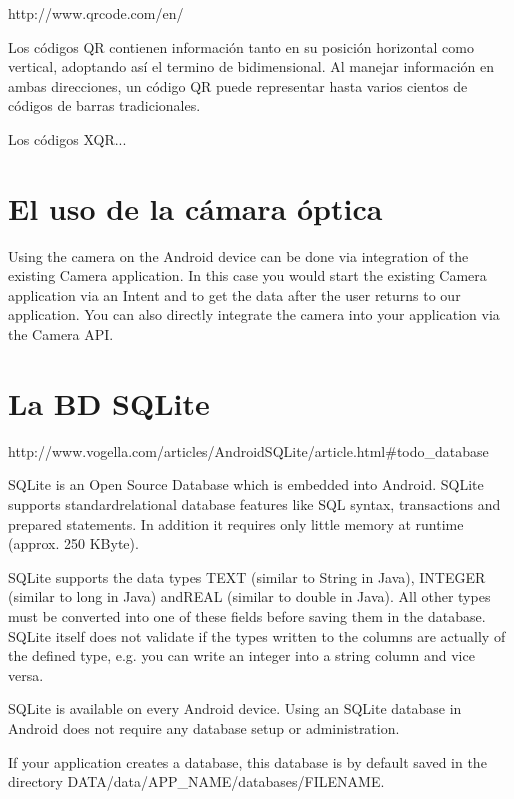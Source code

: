 http://www.qrcode.com/en/

Los c\'odigos QR contienen informaci\'on tanto en su posici\'on horizontal como vertical, adoptando así el termino de bidimensional. Al manejar informaci\'on en ambas direcciones, un c\'odigo QR puede representar hasta varios cientos de c\'odigos de barras tradicionales.

Los c\'odigos XQR...

\section{El uso de la c\'amara \'optica}
\label{sec:tpv.camera}

Using the camera on the Android device can be done via integration of the existing Camera application. In this case you would start the existing Camera application via an Intent and to get the data after the user returns to our application.
You can also directly integrate the camera into your application via the Camera API.

\section{La \ac{BD} SQLite}
\label{sec:tpv.bd}

http://www.vogella.com/articles/AndroidSQLite/article.html\#todo\_database


SQLite is an Open Source Database which is embedded into Android. SQLite supports standardrelational database features like SQL syntax, transactions and prepared statements. In addition it requires only little memory at runtime (approx. 250 KByte).

SQLite supports the data types TEXT (similar to String in Java), INTEGER (similar to long in Java) andREAL (similar to double in Java). All other types must be converted into one of these fields before saving them in the database. SQLite itself does not validate if the types written to the columns are actually of the defined type, e.g. you can write an integer into a string column and vice versa.

SQLite is available on every Android device. Using an SQLite database in Android does not require any database setup or administration.

If your application creates a database, this database is by default saved in the directory DATA/data/APP\_NAME/databases/FILENAME.

